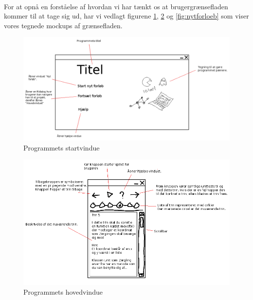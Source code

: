\documentclass[10pt,a4paper,danish]{article}
\begin{document}
\paragraph{}
For at opnå en forståelse af hvordan vi har tænkt os at brugergrænsefladen 
kommer til at tage sig ud, har vi vedlagt figurene \ref{fig:startvindue}, 
\ref{fig:hovedvindue} og  \ref{fig:nytforloeb} som viser vores tegnede mockups
af grænsefladen. \begin{figure}[h]
  \begin{center}
    \includegraphics[scale=0.4]{startvindue.png}
    \caption{Programmets startvindue}
    \label{fig:startvindue}
  \end{center}
\end{figure}
\newpage

\begin{figure}[h]
  \begin{center}
    \includegraphics[scale=0.4]{hovedvindue.png}
    \caption{Programmets hovedvindue}
    \label{fig:hovedvindue}
  \end{center}
\end{figure}
\newpage
\end{document}
